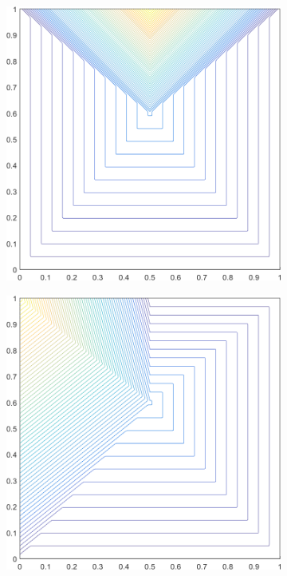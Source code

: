 \begin{figure}
\label{fig::2D_PWLD1_deg_square_basis_functions}
\centering
	\begin{subfigure}[b]{0.39\textwidth}
		\centering
		\includegraphics[width=\textwidth]{figures/sec_BF/deg_square_PWLD1_contour_b4.png}
		\caption{}
	\end{subfigure}
	\vfill
	\begin{subfigure}[b]{0.39\textwidth}
		\centering
		\includegraphics[width=\textwidth]{figures/sec_BF/deg_square_PWLD1_contour_b5.png}

\end{subfigure}
\end{figure}
